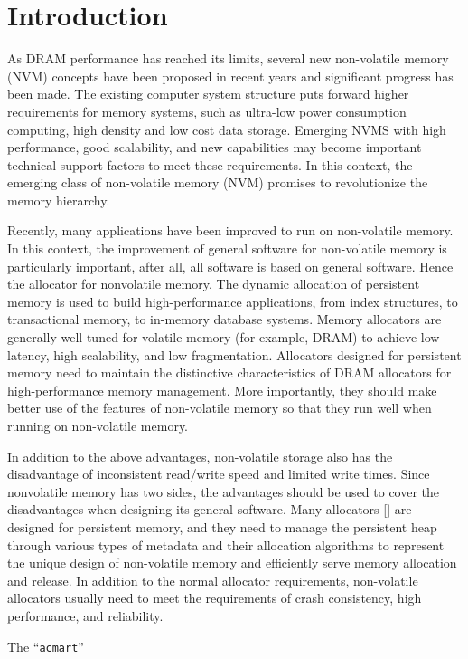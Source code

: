 \documentclass[sigconf]{acmart}
\begin{document}
\section{Introduction}

As DRAM performance has reached its limits, several new non-volatile memory (NVM) concepts have been proposed in recent years and significant progress has been made. The existing computer system structure puts forward higher requirements for memory systems, such as ultra-low power consumption computing, high density and low cost data storage. Emerging NVMS with high performance, good scalability, and new capabilities may become important technical support factors to meet these requirements. In this context, the emerging class of non-volatile memory (NVM) promises to revolutionize the memory hierarchy.

Recently, many applications have been improved to run on non-volatile memory. In this context, the improvement of general software for non-volatile memory is particularly important, after all, all software is based on general software. Hence the allocator for nonvolatile memory. The dynamic allocation of persistent memory is used to build high-performance applications, from index structures, to transactional memory, to in-memory database systems. Memory allocators are generally well tuned for volatile memory (for example, DRAM) to achieve low latency, high scalability, and low fragmentation. Allocators designed for persistent memory need to maintain the distinctive characteristics of DRAM allocators for high-performance memory management. More importantly, they should make better use of the features of non-volatile memory so that they run well when running on non-volatile memory.

In addition to the above advantages, non-volatile storage also has the disadvantage of inconsistent read/write speed and limited write times. Since nonvolatile memory has two sides, the advantages should be used to cover the disadvantages when designing its general software. Many allocators [] are designed for persistent memory, and they need to manage the persistent heap through various types of metadata and their allocation algorithms to represent the unique design of non-volatile memory and efficiently serve memory allocation and release. In addition to the normal allocator requirements, non-volatile allocators usually need to meet the requirements of crash consistency, high performance, and reliability.

The ``\verb|acmart|'' 
\end{document}
